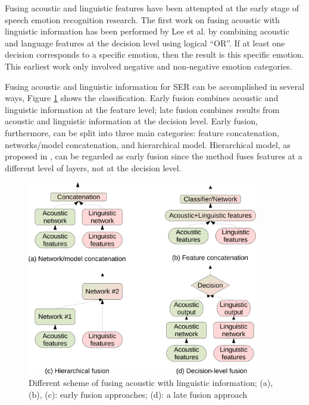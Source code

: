 Fusing acoustic and linguistic features have been attempted at the early stage
of speech emotion recognition research. The first work on fusing acoustic with
linguistic information has been performed by Lee et al. \cite{Lee2002} by
combining acoustic and language features at the decision level using logical
``OR''. If at least one decision corresponds to a specific emotion, then the
result is this specific emotion. This earliest work only involved negative and
non-negative emotion categories.

Fusing acoustic and linguistic information for SER can be accomplished in
several ways, Figure \ref{fig:ser_bimodal} shows the classification. Early
fusion combines acoustic and linguistic information at the feature level; late
fusion combines results from acoustic and linguistic information at the
decision level.  Early fusion, furthermore, can be split into three main
categories: feature concatenation, networks/model concatenation, and
hierarchical model.  Hierarchical model, as proposed in
\cite{Majumder2018,Tian2019}, can be regarded as early fusion since the method
fuses features at a different level of layers, not at the decision level.

\begin{figure}[htbp]
    \centering
    \includegraphics[width=0.9\textwidth]{../fig/ser_bimodal-crop.pdf}
    \caption{Different scheme of fusing acoustic with linguistic information; (a), (b), (c): early fusion approaches; (d): a late fusion approach}
    \label{fig:ser_bimodal}
\end{figure}

